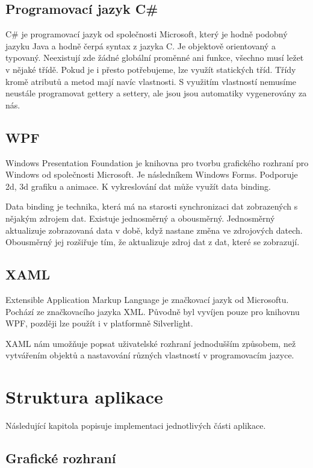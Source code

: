 \documentclass[
  field=inf,
  biblatex,
  glossaries,
  index
]{kidiplom}
\begin{document}
\subsection{Programovací jazyk C\#}
C\# je programovací jazyk od společnosti Microsoft, který je hodně podobný jazyku Java a hodně čerpá syntax z jazyka C. Je objektově orientovaný a typovaný. Neexistují zde žádné globální proměnné ani funkce, všechno musí ležet v nějaké třídě. Pokud je i přesto potřebujeme, lze využít statických tříd. Třídy kromě atributů a metod mají navíc vlastnosti. S využitím vlastností nemusíme neustále programovat gettery a settery, ale jsou jsou automatiky vygenerovány za nás.

\subsection{WPF}
Windows Presentation Foundation je knihovna pro tvorbu grafického rozhraní pro Windows od společnosti Microsoft. Je následníkem Windows Forms. Podporuje 2d, 3d grafiku a animace. K vykreslování dat může využít data binding. 

Data binding je technika, která má na starosti synchronizaci dat zobrazených s nějakým zdrojem dat. Existuje jednosměrný a obousměrný. Jednosměrný aktualizuje zobrazovaná data v době, když nastane změna ve zdrojových datech. Obousměrný jej rozšiřuje tím, že aktualizuje zdroj dat z dat, které se zobrazují.

\subsection{XAML}
Extensible Application Markup Language je značkovací jazyk od Microsoftu. Pochází ze značkovacího jazyka XML. Původně byl vyvíjen pouze pro knihovnu WPF, později lze použít i v platformně Silverlight.

XAML nám umožňuje popsat uživatelské rozhraní jednodušším způsobem, než vytvářením objektů a nastavování různých vlastností v programovacím jazyce.




\section{Struktura aplikace}

Následující kapitola popisuje implementaci jednotlivých části aplikace.

\subsection{Grafické rozhraní}
\end{document}
